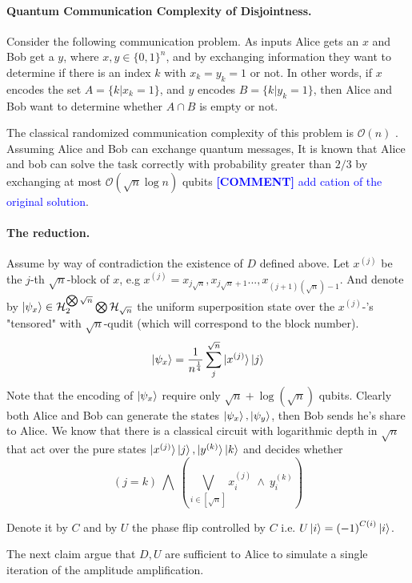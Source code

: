 \documentclass{article}
\newcommand{\commentt}[1]{\textcolor{blue}{ \textbf{[COMMENT]} #1}}
\newcommand{\ctt}[1]{\commentt{#1}}
\newcommand{\onotation}[1]{\(\mathcal{O} \left( {#1}  \right) \)}
\newcommand{\ona}[1]{\onotation{#1}}
\begin{document}
\begin{multicols}{2}
\paragraph{Quantum Communication Complexity of Disjointness.}
Consider the following communication problem.
As inputs Alice gets an \(x\) and Bob get a \(y\), where \(x, y \in \{0, 1\}^n \), and by exchanging information they want to determine if there is an index \(k\) with \(x_k = y_k = 1 \) or not. 
In other words, if \(x\) encodes the set \(A = \{k | x_k = 1\} \), and \(y\) encodes \(B = \{k | y_k = 1\}\), 
then Alice and Bob want to determine whether \( A \cap B \) is empty or not.

The classical randomized communication complexity of this problem is \ona{n} \cite{v003a011}.
Assuming Alice and Bob can exchange quantum messages, It is known that Alice and bob can solve the task
correctly with probability greater than \(2/3\) by exchanging at most \ona{\sqrt{n}\log n } qubits \ctt{add cation of the original solution}. 


\paragraph{The reduction.} 
Assume by way of contradiction the existence of $D$ defined above.  
Let \( x^{(j)} \) be the \(j\)-th \(\sqrt{n}\)-block of \(x\), e.g \(x^{(j)} = x_{j\sqrt{n}},x_{j\sqrt{n}+1}...,x_{(j+1)(\sqrt{n})-1}  \). And denote by \( \ket{\psi_x} \in \mathcal{H}_{2}^{\bigotimes \sqrt{n}} \bigotimes \mathcal{H}_{\sqrt{n}} \) the uniform superposition state over the \( x^{(j)}\)-'s "tensored" with \(\sqrt{n}\)-qudit (which will correspond to the block number). 
\[ \ket{\psi_x} = \frac{1}{n^\frac{1}{4}}\sum_{j}^{\sqrt{n}}\ket{x^{(j)}}\ket{j} \] Note that the encoding of \( \ket{\psi_x} \) require only \( \sqrt{n} + \log(\sqrt{n}) \) qubits.
Clearly both Alice and Bob can generate the states \( \ket{\psi_x}, \ket{\psi_y} \), then Bob sends he's share to Alice.
We know that there is a classical circuit with logarithmic depth in \( \sqrt{n} \) that act over the pure states \( \ket{x^{(j)}}\ket{j} , \ket{y^{(k)}}\ket{k} \) and decides whether \[ \left( j =  k \right) \ \bigwedge  \ \left( \bigvee_{i \in [ \sqrt{n} ] } x^{(j)}_{i} \ \wedge \  y^{(k)}_{i} \right)   \]


Denote it by \( C \) and by \( U \) the phase flip controlled by $C$ i.e. $U\ket{i}=\left( -1 \right)^{C\left( i \right)}\ket{i}$. 

The next claim argue that $D,U$ are sufficient to Alice to simulate a single iteration of the amplitude amplification.  


\end{multicols}
\end{document}
